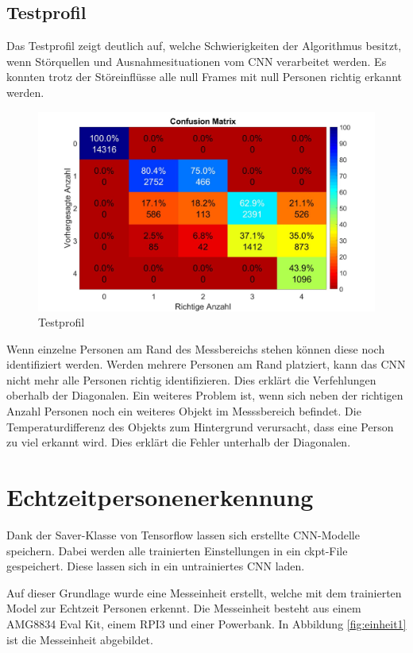 \subsection{Testprofil}
\label{subsec:Testprofil}
Das Testprofil zeigt deutlich auf, welche Schwierigkeiten der Algorithmus besitzt, wenn Störquellen und Ausnahmesituationen vom \ac{CNN} verarbeitet werden. Es konnten trotz der Störeinflüsse alle null Frames mit null Personen richtig erkannt werden. 
 
\begin{figure}[H]
	\centering
	\includegraphics[width=0.55\linewidth]{fig/Testprofilm}
	\caption{Testprofil}
	\label{fig:profil4}
\end{figure}

Wenn einzelne Personen am Rand des Messbereichs stehen können diese noch identifiziert werden. Werden mehrere Personen am Rand platziert, kann das \ac{CNN} nicht mehr alle Personen richtig identifizieren. Dies erklärt die Verfehlungen oberhalb der Diagonalen.
Ein weiteres Problem ist, wenn sich neben der richtigen Anzahl Personen noch ein weiteres Objekt im Messsbereich befindet. Die Temperaturdifferenz des Objekts zum Hintergrund verursacht, dass eine Person zu viel erkannt wird. Dies erklärt die Fehler unterhalb der Diagonalen. 

\newpage

\section{Echtzeitpersonenerkennung}
\label{sec:Echtzeitpersonenerkennung}
Dank der Saver-Klasse von Tensorflow lassen sich erstellte \ac{CNN}-Modelle speichern. Dabei werden alle trainierten Einstellungen in ein ckpt-File gespeichert. Diese lassen sich in ein untrainiertes \ac{CNN} laden.

Auf dieser Grundlage wurde eine Messeinheit erstellt, welche mit dem trainierten Model zur Echtzeit Personen erkennt. Die Messeinheit besteht aus einem AMG8834 Eval Kit, einem \ac{RPI3} und einer Powerbank. 
In Abbildung \ref{fig:einheit1} ist die Messeinheit abgebildet. 


